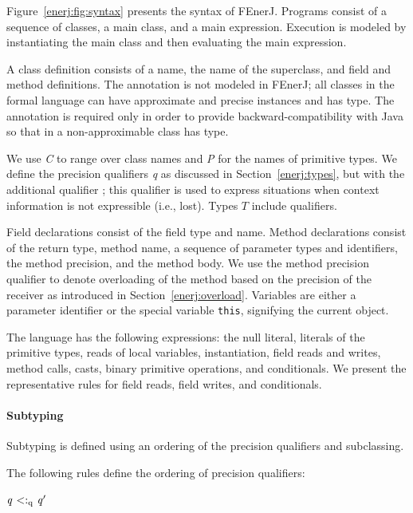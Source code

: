 Figure~\ref{enerj:fig:syntax} presents the syntax of FEnerJ.
Programs consist of a sequence of classes, a main class, and a main
expression. Execution is modeled by instantiating
the main class and then evaluating the main expression.

A class definition consists of a name, the name of the superclass, and
field and method definitions.
The  annotation is not modeled in FEnerJ; all classes in
the formal language can have approximate and precise instances and
 has  type.
The annotation is required only in order
to provide backward-compatibility with Java so that  in a
non-approximable class has  type.

We use \textit{C} to range over class names and \textit{P} for the
names of primitive types.
We define the precision qualifiers \textit{q} as discussed in Section~\ref{enerj:types},
but with the additional qualifier \lost{}; this qualifier is used to
express situations when context information is not expressible
(i.e., lost).
Types $T$ include qualifiers.

Field declarations consist of the field type and name.
Method declarations consist of the return type, method name, a
sequence of parameter types and identifiers, the method precision, and
the method body. We use the method precision qualifier to denote
overloading of the method based on the precision of the receiver as
introduced in Section~\ref{enerj:overload}.
Variables are either a parameter identifier or the special variable
\texttt{this}, signifying the current object.

The language has the following expressions:
the null literal,
literals of the primitive types,
reads of local variables,
instantiation,
field reads and writes,
method calls,
casts,
binary primitive operations, and
conditionals.
We present the representative rules for
field reads, field writes, and conditionals.


\paragraph{Subtyping}
Subtyping is defined using an ordering of the precision qualifiers and
subclassing.

\renewcommand{\ottdrulename}[1]{}

The following rules define the ordering of precision qualifiers:

\vspace{1.0ex}
\noindent
\begin{ottdefnblock}[#1]{$ \mathit{q} \  \textsf{$<:_{\mathrm{q}}$} \  \mathit{q'} $}{}
\begin{centering}
\ottusedrule{\ottdruleqqXXlost{}} \hspace{1em}
\ottusedrule{\ottdruleqqXXtop{}} \hspace{1em}
\ottusedrule{\ottdruleqqXXrefl{}}\\
\end{centering}
\end{ottdefnblock}
\vspace{1.5ex}

